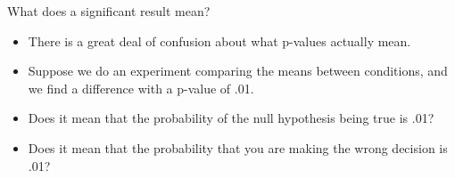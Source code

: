 \documentclass[handout]{beamer}
\begin{document}
\begin{frame}{What does a significant result mean?}
\scriptsize{
\begin{itemize}
 \item There is a great deal of confusion about what p-values actually mean.
 \item Suppose we do an experiment comparing the means between conditions, and we find a difference with a p-value of .01.
 \item Does it mean that the probability of the null hypothesis being true is .01?
\item  Does it mean that the probability that you are making the wrong decision is .01? 

 
 
\end{itemize}
}
 
\end{frame}
\end{document}
